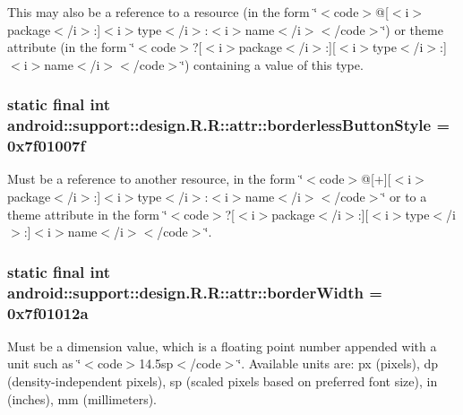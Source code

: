 This may also be a reference to a resource (in the form \char`\"{}$<$code$>$@\mbox{[}$<$i$>$package$<$/i$>$:\mbox{]}$<$i$>$type$<$/i$>$:$<$i$>$name$<$/i$>$$<$/code$>$\char`\"{}) or theme attribute (in the form \char`\"{}$<$code$>$?\mbox{[}$<$i$>$package$<$/i$>$:\mbox{]}\mbox{[}$<$i$>$type$<$/i$>$:\mbox{]}$<$i$>$name$<$/i$>$$<$/code$>$\char`\"{}) containing a value of this type. \hypertarget{classandroid_1_1support_1_1design_1_1_r_1_1attr_1ef52f1e12f0569dd0b169cddc749351}{
\subsubsection[{borderlessButtonStyle}]{\setlength{\rightskip}{0pt plus 5cm}static final int android::support::design.R.R::attr::borderlessButtonStyle = 0x7f01007f}}
\label{classandroid_1_1support_1_1design_1_1_r_1_1attr_1ef52f1e12f0569dd0b169cddc749351}


Must be a reference to another resource, in the form \char`\"{}$<$code$>$@\mbox{[}+\mbox{]}\mbox{[}$<$i$>$package$<$/i$>$:\mbox{]}$<$i$>$type$<$/i$>$:$<$i$>$name$<$/i$>$$<$/code$>$\char`\"{} or to a theme attribute in the form \char`\"{}$<$code$>$?\mbox{[}$<$i$>$package$<$/i$>$:\mbox{]}\mbox{[}$<$i$>$type$<$/i$>$:\mbox{]}$<$i$>$name$<$/i$>$$<$/code$>$\char`\"{}. \hypertarget{classandroid_1_1support_1_1design_1_1_r_1_1attr_ea4144bd76839db12bd9b4f0b4c42bb3}{
\subsubsection[{borderWidth}]{\setlength{\rightskip}{0pt plus 5cm}static final int android::support::design.R.R::attr::borderWidth = 0x7f01012a}}
\label{classandroid_1_1support_1_1design_1_1_r_1_1attr_ea4144bd76839db12bd9b4f0b4c42bb3}


Must be a dimension value, which is a floating point number appended with a unit such as \char`\"{}$<$code$>$14.5sp$<$/code$>$\char`\"{}. Available units are: px (pixels), dp (density-independent pixels), sp (scaled pixels based on preferred font size), in (inches), mm (millimeters). 

